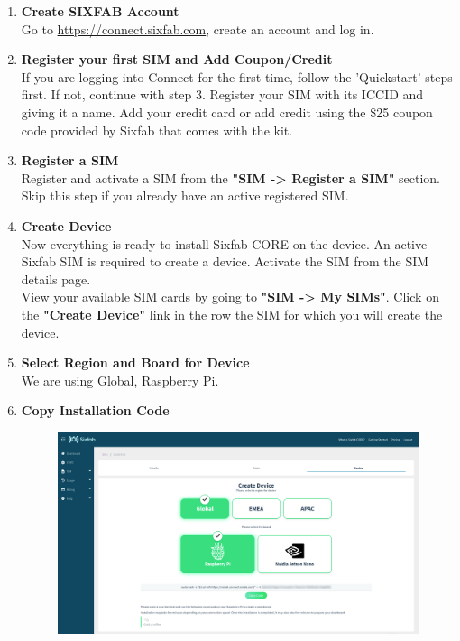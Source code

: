 \documentclass[12pt, letterpaper]{article}
\begin{document}
{{\begin{enumerate}[label=\large{\textbf{\arabic*}.}]
	\item \textbf{\large{Create SIXFAB Account}} \\[1\baselineskip]
	\noindent Go to \url{https://connect.sixfab.com}, create an account and log in.
	\item \textbf{\large{Register your first SIM and Add Coupon/Credit}} \\[1\baselineskip]
	If you are logging into Connect for the first time, follow the 			
	'Quickstart' steps first. If not, continue with step 3.
	Register your SIM with its ICCID and giving it a name. Add your credit 
	card or add credit using the \$25 coupon code provided by Sixfab that 
	comes with the kit.
	\item \textbf{\large{Register a SIM}} \\[1\baselineskip]
	\noindent Register and activate a SIM from the \textbf{"SIM -> Register a SIM"} section. Skip this step if you already have an active registered SIM.
	\item \textbf{\large{Create Device}} \\[1\baselineskip]
	\noindent Now everything is ready to install Sixfab CORE on the device.
An active Sixfab SIM is required to create a device. Activate the SIM from the SIM details page. \\[0.5\baselineskip]
	\noindent View your available SIM cards by going to \textbf{"SIM -> My SIMs"}. Click on the \textbf{"Create Device"} link in the row the SIM for which you will create the device.
	\item \textbf{\large{Select Region and Board for Device}} \\[1\baselineskip]	
	\noindent We are using Global, Raspberry Pi.
	\item \textbf{\large{Copy Installation Code}} \\[1\baselineskip]
	\begin{figure}[h!]
	\centering
	\includegraphics[width=1\columnwidth]{assets/Sixfab-Connect-SIM-Data-Management-select-region.png}

\end{figure}
\end{enumerate}}}
\end{document}
